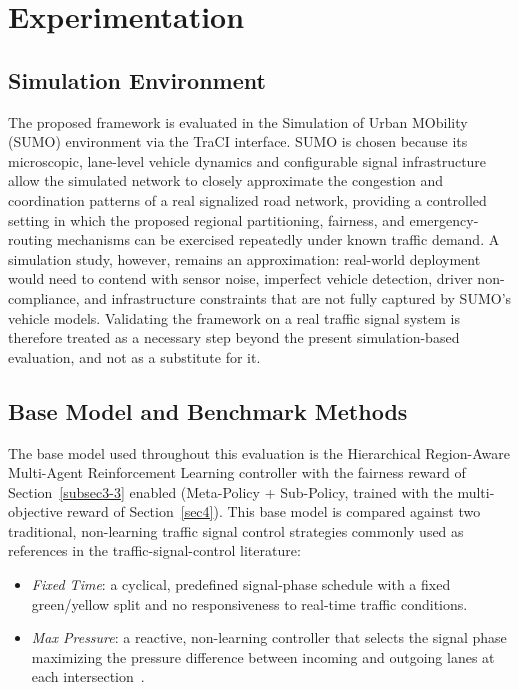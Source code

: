 \documentclass[3p,times]{elsarticle}
\theoremstyle{plain}
\theoremstyle{definition}
\begin{document}
\section{Experimentation}\label{sec5}

\subsection{Simulation Environment}\label{subsec5-1}

The proposed framework is evaluated in the Simulation of Urban MObility
(SUMO) environment via the TraCI interface. SUMO is chosen because its
microscopic, lane-level vehicle dynamics and configurable signal
infrastructure allow the simulated network to closely approximate the
congestion and coordination patterns of a real signalized road network,
providing a controlled setting in which the proposed regional
partitioning, fairness, and emergency-routing mechanisms can be
exercised repeatedly under known traffic demand. A simulation study,
however, remains an approximation: real-world deployment would need to
contend with sensor noise, imperfect vehicle detection, driver
non-compliance, and infrastructure constraints that are not fully
captured by SUMO's vehicle models. Validating the framework on a real
traffic signal system is therefore treated as a necessary step beyond
the present simulation-based evaluation, and not as a substitute for
it.

\subsection{Base Model and Benchmark Methods}\label{subsec5-2}

The base model used throughout this evaluation is the Hierarchical
Region-Aware Multi-Agent Reinforcement Learning controller with the
fairness reward of Section~\ref{subsec3-3} enabled (Meta-Policy +
Sub-Policy, trained with the multi-objective reward of
Section~\ref{sec4}). This base model is compared against two
traditional, non-learning traffic signal control strategies commonly
used as references in the traffic-signal-control literature:

\begin{itemize}
\item \textit{Fixed Time}: a cyclical, predefined signal-phase schedule
with a fixed green/yellow split and no responsiveness to real-time
traffic conditions.
\item \textit{Max Pressure}: a reactive, non-learning controller that
selects the signal phase maximizing the pressure difference between
incoming and outgoing lanes at each intersection~\cite{maxpressure}.
\end{itemize}
\end{document}
